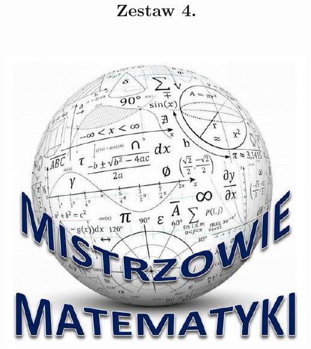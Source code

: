 \documentclass[10pt]{article}
\title{Zestaw 4. }
\author{}
\date{}
\begin{document}
\maketitle
\begin{center}
\includegraphics[max width=\textwidth]{2024_11_21_4c68055ab3cf36522636g-1(1)}
\end{center}
\end{document}
